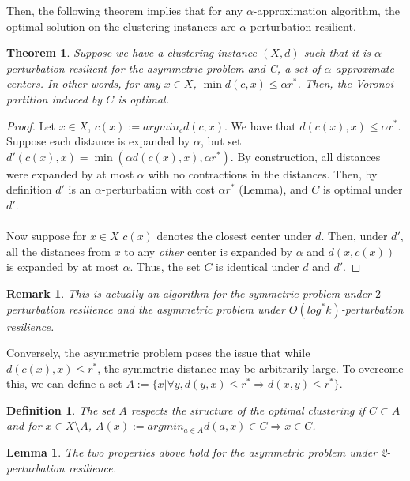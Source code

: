 \documentclass{article}
\newtheorem{theorem}{Theorem}
\newtheorem{definition}{Definition}
\newtheorem{remark}{Remark}
\newtheorem{lemma}{Lemma}
\begin{document}
Then, the following theorem implies that for any $\alpha$-approximation algorithm, the optimal solution on the clustering instances are $\alpha$-perturbation resilient.

\begin{theorem}
Suppose we have a clustering instance $(X,d)$ such that it is $\alpha$-perturbation resilient for the asymmetric problem and C, a set of $\alpha$-approximate centers. In other words, for any $x\in X$, $\min d(c,x)\leq\alpha r^*$. Then, the Voronoi partition induced by $C$ is optimal.
\end{theorem}

\begin{proof}
Let $x\in X$, $c(x):=arg min_cd(c,x)$. We have that $d(c(x),x)\leq\alpha r^*$. Suppose each distance is expanded by $\alpha$, but set $d'(c(x),x)=\min(\alpha d(c(x),x),\alpha r^*)$. By construction, all distances were expanded by at most $\alpha$ with no contractions in the distances. Then, by definition $d'$ is an $\alpha$-perturbation with cost $\alpha r^*$ (Lemma), and $C$ is optimal under $d'$.\\\\

Now suppose for $x\in X$ $c(x)$ denotes the closest center under $d$. Then, under $d'$, all the distances from $x$ to any \emph{other} center is expanded by $\alpha$ and $d(x,c(x))$ is expanded by at most $\alpha$. Thus, the set $C$ is identical under $d$ and $d'$.
\end{proof}

\begin{remark}
This is actually an algorithm for the symmetric problem under $2$-perturbation resilience and the asymmetric problem under $O(log^*k)$-perturbation resilience.
\end{remark}

Conversely, the asymmetric problem poses the issue that while $d(c(x),x)\leq r^*$, the symmetric distance may be arbitrarily large. To overcome this, we can define a set $A:=\{x|\forall y,d(y,x)\leq r^*\Rightarrow d(x,y)\leq r^*\}$.

\begin{definition}
The set $A$ \emph{respects the structure of the optimal clustering} if $C\subset A$ and for $x\in X\setminus A$, $A(x):=argmin_{a\in A}d(a,x)\in C\Rightarrow x\in C$.
\end{definition}

\begin{lemma}
The two properties above hold for the asymmetric problem under 2-perturbation resilience.
\end{lemma}
\end{document}
